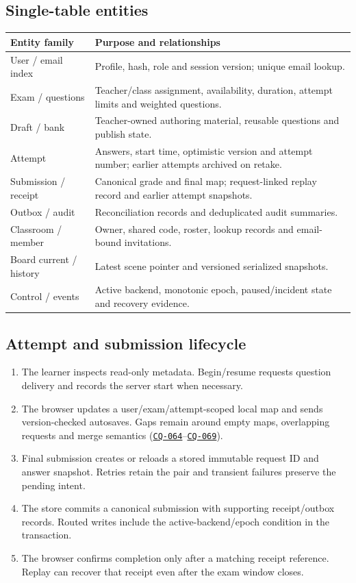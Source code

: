 \documentclass[11pt,a4paper]{article}
\DeclareRobustCommand{\issue}[1]{\hyperlink{#1}{\texttt{#1}}}
\begin{document}
\subsection{Single-table entities}
\begin{tabularx}{\textwidth}{@{}P{36mm}X@{}}\toprule Entity family & Purpose and relationships \\\midrule
User / email index & Profile, hash, role and session version; unique email lookup. \\
Exam / questions & Teacher/class assignment, availability, duration, attempt limits and weighted questions. \\
Draft / bank & Teacher-owned authoring material, reusable questions and publish state. \\
Attempt & Answers, start time, optimistic version and attempt number; earlier attempts archived on retake. \\
Submission / receipt & Canonical grade and final map; request-linked replay record and earlier attempt snapshots. \\
Outbox / audit & Reconciliation records and deduplicated audit summaries. \\
Classroom / member & Owner, shared code, roster, lookup records and email-bound invitations. \\
Board current / history & Latest scene pointer and versioned serialized snapshots. \\
Control / events & Active backend, monotonic epoch, paused/incident state and recovery evidence. \\\bottomrule\end{tabularx}
\subsection{Attempt and submission lifecycle}
\begin{enumerate}
\item The learner inspects read-only metadata. Begin/resume requests question delivery and records the server start when necessary.
\item The browser updates a user/exam/attempt-scoped local map and sends version-checked autosaves. Gaps remain around empty maps, overlapping requests and merge semantics (\issue{CQ-064}--\issue{CQ-069}).
\item Final submission creates or reloads a stored immutable request ID and answer snapshot. Retries retain the pair and transient failures preserve the pending intent.
\item The store commits a canonical submission with supporting receipt/outbox records. Routed writes include the active-backend/epoch condition in the transaction.
\item The browser confirms completion only after a matching receipt reference. Replay can recover that receipt even after the exam window closes.
\end{enumerate}
\end{document}
